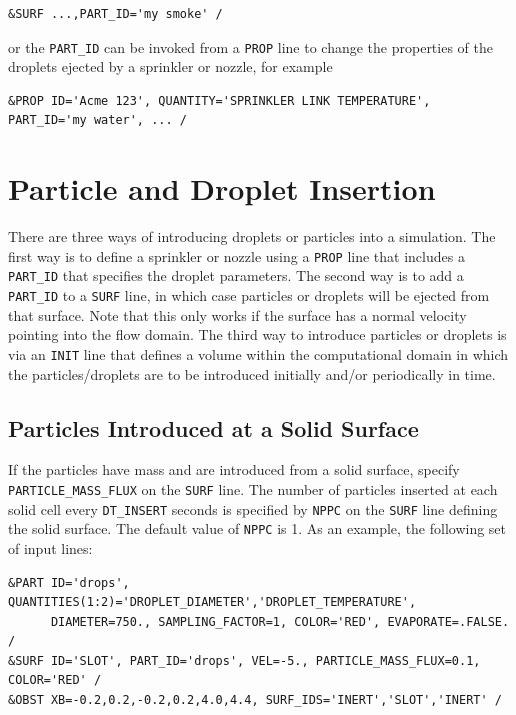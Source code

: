 \documentclass[11pt]{book}
\newcommand{\ct}{\tt\small}
\begin{document}
\footnotesize
\begin{verbatim}
&SURF ...,PART_ID='my smoke' /
\end{verbatim}
\normalsize
or the {\ct PART\_ID} can be invoked from a {\ct PROP} line to change
the properties of the droplets ejected by a sprinkler or nozzle, for example

\footnotesize
\begin{verbatim}
&PROP ID='Acme 123', QUANTITY='SPRINKLER LINK TEMPERATURE', PART_ID='my water', ... /
\end{verbatim}
\normalsize



\clearpage

\section{Particle and Droplet Insertion}
\label{info:controlling_droplets}

There are three ways of introducing droplets or particles into a simulation. The first way is to define a sprinkler or
nozzle using a {\ct PROP} line that includes a {\ct PART\_ID} that specifies the droplet parameters. The second way is to
add a {\ct PART\_ID} to a {\ct SURF} line, in which case particles or droplets will be ejected from that surface. Note that
this only works if the surface has a normal velocity pointing into the flow domain. The third way to introduce particles or
droplets is via an {\ct INIT} line that defines a volume within the computational domain in which the particles/droplets are
to be introduced initially and/or periodically in time.


\subsection{Particles Introduced at a Solid Surface}
\label{info:particle_flux}

If the particles have mass and are introduced from a solid surface, specify {\ct PARTICLE\_MASS\_FLUX} on the {\ct SURF} line.
The number of particles inserted at each solid cell every
{\ct DT\_INSERT} seconds is specified by {\ct NPPC} on the {\ct SURF} line defining the solid surface. The default
value of {\ct NPPC} is 1. As an example, the following set of input lines:

\footnotesize
\begin{verbatim}
&PART ID='drops', QUANTITIES(1:2)='DROPLET_DIAMETER','DROPLET_TEMPERATURE',
      DIAMETER=750., SAMPLING_FACTOR=1, COLOR='RED', EVAPORATE=.FALSE. /
&SURF ID='SLOT', PART_ID='drops', VEL=-5., PARTICLE_MASS_FLUX=0.1, COLOR='RED' /
&OBST XB=-0.2,0.2,-0.2,0.2,4.0,4.4, SURF_IDS='INERT','SLOT','INERT' /
\end{verbatim} \normalsize
\end{document}
